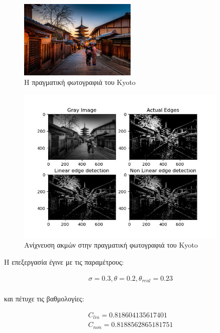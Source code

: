 \documentclass{article}
\newcommand{\eng}[1]{\foreignlanguage{english}{#1}}
\begin{document}
\begin{figure}[h]
    \centering
    \includegraphics[width=0.5\textwidth]{../image-plots/kyoto_edges.jpg}
    \caption{Η πραγματική φωτογραφιά του \eng{Kyoto}}
    \label{fig:kyoto}
\end{figure}
\begin{figure}[h]
    \centering
    \includegraphics[width=0.9\textwidth]{../image-plots/edges-real.jpg}
    \caption{Ανίχνευση ακμών στην πραγματική φωτογραφιά του \eng{Kyoto}}
    \label{fig:kyoto-edges}
\end{figure}
\FloatBarrier

Η επεξεργασία έγινε με τις παραμέτρους:

\begin{equation}
    \begin{gathered}
        \sigma = 0.3, \theta = 0.2, \theta_{real} = 0.23 \\
    \end{gathered}
\end{equation}

και πέτυχε τις βαθμολογίες:

\begin{equation}
    \begin{gathered}
        C_{lin} = 0.818604135617401\\
        C_{non} = 0.8188562865181751
    \end{gathered}
\end{equation}
\end{document}
